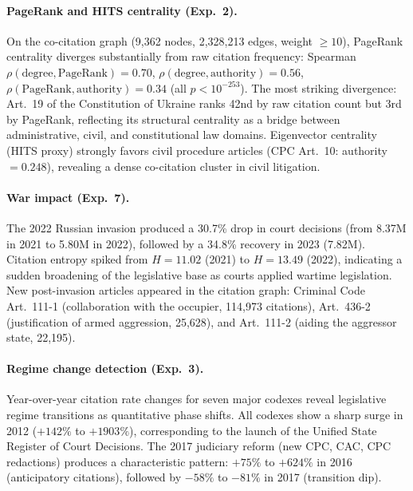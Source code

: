 \documentclass[11pt]{article}
\begin{document}
\paragraph{PageRank and HITS centrality (Exp.~2).}
On the co-citation graph (9,362 nodes, 2,328,213 edges, weight $\geq 10$), PageRank centrality diverges substantially from raw citation frequency: Spearman $\rho(\text{degree}, \text{PageRank}) = 0.70$, $\rho(\text{degree}, \text{authority}) = 0.56$, $\rho(\text{PageRank}, \text{authority}) = 0.34$ (all $p < 10^{-253}$).
The most striking divergence: Art.~19 of the Constitution of Ukraine ranks 42nd by raw citation count but 3rd by PageRank, reflecting its structural centrality as a bridge between administrative, civil, and constitutional law domains.
Eigenvector centrality (HITS proxy) strongly favors civil procedure articles (CPC Art.~10: authority $= 0.248$), revealing a dense co-citation cluster in civil litigation.

\paragraph{War impact (Exp.~7).}
The 2022 Russian invasion produced a 30.7\% drop in court decisions (from 8.37M in 2021 to 5.80M in 2022), followed by a 34.8\% recovery in 2023 (7.82M).
Citation entropy spiked from $H = 11.02$ (2021) to $H = 13.49$ (2022), indicating a sudden broadening of the legislative base as courts applied wartime legislation.
New post-invasion articles appeared in the citation graph: Criminal Code Art.~111-1 (collaboration with the occupier, 114,973 citations), Art.~436-2 (justification of armed aggression, 25,628), and Art.~111-2 (aiding the aggressor state, 22,195).

\paragraph{Regime change detection (Exp.~3).}
Year-over-year citation rate changes for seven major codexes reveal legislative regime transitions as quantitative phase shifts.
All codexes show a sharp surge in 2012 ($+142\%$ to $+1903\%$), corresponding to the launch of the Unified State Register of Court Decisions.
The 2017 judiciary reform (new CPC, CAC, CPC redactions) produces a characteristic pattern: $+75\%$ to $+624\%$ in 2016 (anticipatory citations), followed by $-58\%$ to $-81\%$ in 2017 (transition dip).
\end{document}
